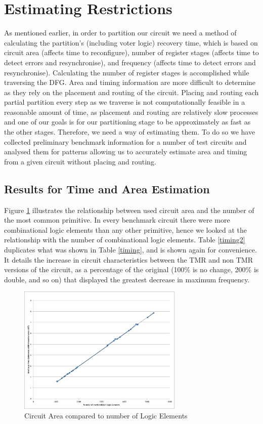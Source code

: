 \documentclass[12pt,final,oneside]{dwThesis} %
\begin{document}
   \section{Estimating Restrictions}
   As mentioned earlier, in order to partition our circuit we need a method of calculating the partition's (including voter logic) recovery time, which is based on circuit area (affects time to reconfigure), number of register stages (affects time to detect errors and resynchronise), and frequency (affects time to detect errors and resynchronise). Calculating the number of register stages is accomplished while traversing the \ac{DFG}.
   Area and timing information are more difficult to determine as they rely on the placement and routing of the circuit. Placing and routing each partial partition every step as we traverse is not computationally feasible in a reasonable amount of time, as placement and routing are relatively slow processes and one of our goals is for our partitioning stage to be approximately as fast as the other stages. Therefore, we need a way of estimating them. To do so we have collected preliminary benchmark information for a number of test circuits and analysed them for patterns allowing us to accurately estimate area and timing from a given circuit without placing and routing.

   \subsection{Results for Time and Area Estimation}
   Figure \ref{AreaVElements} illustrates the relationship between used circuit area and the number of the most common primitive. In every benchmark circuit there were more combinational logic elements than any other primitive, hence we looked at the relationship with the number of combinational logic elements. Table \ref{timing2} duplicates what was shown in Table \ref{timing}, and is shown again for convenience. It details the increase in circuit characteristics between the \ac{TMR} and non \ac{TMR} versions of the circuit, as a percentage of the original (100\% is no change, 200\% is double, and so on) that displayed the greatest decrease in maximum frequency.
   \begin{figure}
      \begin{center}
         \includegraphics[width=0.7\textwidth]{images/area-v-elements.png}
         \caption{Circuit Area compared to number of Logic Elements}
         \label{AreaVElements}
      \end{center}
   \end{figure}
\end{document}
